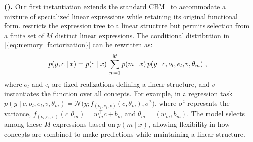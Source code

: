 \documentclass{article}
\theoremstyle{plain}
\theoremstyle{definition}
\theoremstyle{remark}
\newcommand{\mypar}[1]{\noindent\textbf{#1}}
\begin{document}
\mypar{\linear{} (\linearacro).}
Our first instantiation extends the standard CBM~\citep{koh2020concept} to accommodate a mixture of specialized linear expressions while retaining its original functional form. \linearacro{} restricts the expression tree to a linear structure but permits selection from a finite set of $M$ distinct linear expressions. 
The conditional distribution in \cref{{eq:memory_factorization}} can be rewritten as:
\begin{equation}
\small
\label{eq:lin_factorization}
    p(y,c \mid x) =
    p(c\mid x)\,\sum_{m=1}^{M} p(m\mid x)\, p(y\mid c, o_l,e_l,v,\theta_m) \ ,    
\end{equation}
where $o_l$ and $e_l$ are fixed realizations defining a linear structure, and $v$ instantiates the function over all concepts. For example, in a regression task $p(y \mid c, o_l,e_l,v,\theta_m) = \mathcal{N}\big(y; f_{(o_l,e_l,v)}(c, \theta_m), \sigma^2\big)$, where $\sigma^2$ represents the variance, $f_{(o_l,e_l,v)}(c; \theta_m) = w_m^\top c + b_m$ and $\theta_m = (w_m, b_m)$. The model selects among these $M$ expressions based on $p(m \mid x)$, allowing flexibility in how concepts are combined to make predictions while maintaining a linear structure.
\end{document}
